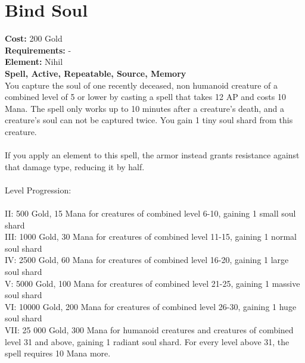 \section{Bind Soul}
\textbf{Cost:} 200 Gold\\
\textbf{Requirements:} -\\
\textbf{Element:} Nihil\\
\textbf{Spell, Active, Repeatable, Source, Memory}\\
You capture the soul of one recently deceased, non humanoid creature of a combined level of 5 or lower by casting a spell that takes 12 AP and costs 10 Mana. The spell only works up to 10 minutes after a creature’s death, and a creature’s soul can not be captured twice. You gain 1 tiny soul shard from this creature.\\
\\
If you apply an element to this spell, the armor instead grants resistance against that damage type, reducing it by half.\\
\\
Level Progression:\\
\\
II: 500 Gold, 15 Mana for creatures of combined level 6-10, gaining 1 small soul shard\\
III: 1000 Gold, 30 Mana for creatures of combined level 11-15, gaining 1 normal soul shard\\
IV: 2500 Gold, 60 Mana for creatures of combined level 16-20, gaining 1 large soul shard\\
V: 5000 Gold, 100 Mana for creatures of combined level 21-25, gaining 1 massive soul shard\\
VI: 10000 Gold, 200 Mana for creatures of combined level 26-30, gaining 1 huge soul shard\\
VII: 25 000 Gold, 300 Mana for humanoid creatures and creatures of combined level 31 and above, gaining 1 radiant soul shard. For every level above 31, the spell requires 10 Mana more.\\